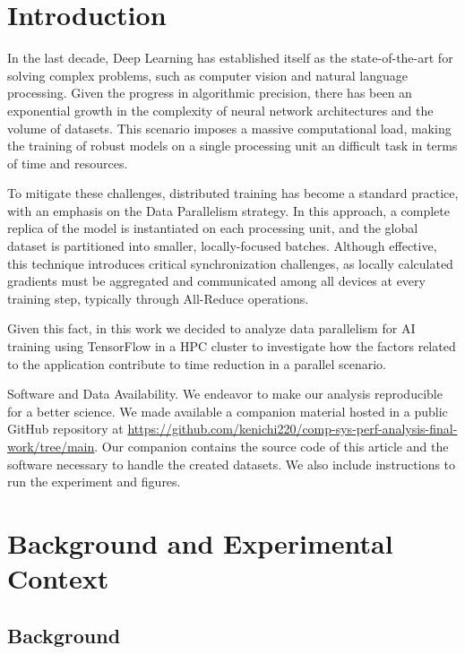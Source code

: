 \documentclass[format=acmsmall, review=false, screen=true]{acmart}
\begin{document}
\section{Introduction}
\label{sec:org2f97682}

In the last decade, Deep Learning has established itself as the
state-of-the-art for solving complex problems, such as computer vision
and natural language processing. Given the progress in algorithmic
precision, there has been an exponential growth in the complexity of
neural network architectures and the volume of datasets. This scenario
imposes a massive computational load, making the training of robust
models on a single processing unit an difficult task in terms of time
and resources.

To mitigate these challenges, distributed training has become a
standard practice, with an emphasis on the Data Parallelism
strategy. In this approach, a complete replica of the model is
instantiated on each processing unit, and the global
dataset is partitioned into smaller, locally-focused batches. Although
effective, this technique introduces critical synchronization
challenges, as locally calculated gradients must be aggregated and
communicated among all devices at every training step, typically
through All-Reduce operations.

Given this fact, in this work we decided to analyze data parallelism
for AI training using TensorFlow in a HPC cluster to investigate how
the factors related to the application contribute to time reduction in
a parallel scenario.

\noindent
\alert{Software and Data Availability}. We endeavor to make our analysis
reproducible for a better science. We made available a companion
material hosted in a public GitHub repository at
{\scriptsize\url{https://github.com/kenichi220/comp-sys-perf-analysis-final-work/tree/main}}.
Our companion contains the source code of this article and the
software necessary to handle the created datasets. We also include
instructions to run the experiment and figures.

\section{Background and Experimental Context}
\label{sec:org6868e90}
\label{sec.context}
\subsection{Background}
\label{sec:org477e439}
\label{sec.background}
\end{document}
